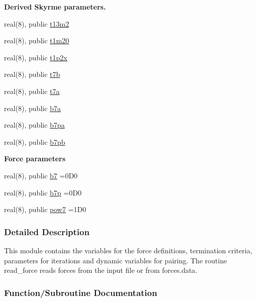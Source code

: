 \begin{Indent}{\bf Derived Skyrme parameters.}
\begin{DoxyCompactItemize}
\item 
real(8), public \hyperlink{namespacedynpar_ab04204e630574c39eb93c4807ea96950}{t13m2}
\item 
real(8), public \hyperlink{namespacedynpar_add6c411b3280d4e9eb751927a1f0d170}{t1m20}
\item 
real(8), public \hyperlink{namespacedynpar_a9d9fe6f7b4326da8b18d74cca5e547df}{t1p2x}
\item 
real(8), public \hyperlink{namespacedynpar_a854df581a7d115b4efe0c4b8c1ef2b2a}{t7b}
\item 
real(8), public \hyperlink{namespacedynpar_abb0f2830794bbbf63ad3e66d51efd586}{t7a}
\item 
real(8), public \hyperlink{namespacedynpar_a8ef7736a5a05040ea9ff5b58092f3da9}{b7a}
\item 
real(8), public \hyperlink{namespacedynpar_a4ac29c0b2af112a5baa962972b7d4384}{b7pa}
\item 
real(8), public \hyperlink{namespacedynpar_a51bcba5e99e6dce530692249dc71558e}{b7pb}
\end{DoxyCompactItemize}
\end{Indent}
\begin{Indent}{\bf Force parameters}\par
\begin{DoxyCompactItemize}
\item 
real(8), public \hyperlink{namespacedynpar_a9ed3cf4b8f932ee2bc28104ec0b67e6c}{b7} =0\+D0
\item 
real(8), public \hyperlink{namespacedynpar_a36d879245fe80ba1577658c7c1da1a1d}{b7p} =0\+D0
\item 
real(8), public \hyperlink{namespacedynpar_a66a358da61845e6d07f37be5fd8e6f59}{pow7} =1\+D0
\end{DoxyCompactItemize}
\end{Indent}


\subsubsection{Detailed Description}
This module contains the variables for the force definitions, termination criteria, parameters for iterations and dynamic variables for pairing. The routine {\ttfamily read\+\_\+force} reads forces from the input file or from forces.\+data. 

\subsubsection{Function/\+Subroutine Documentation}
